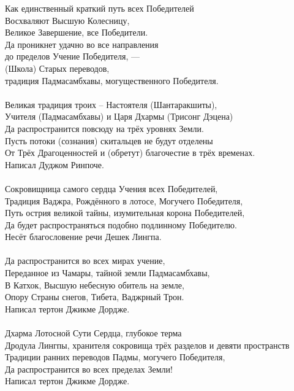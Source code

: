
Как единственный краткий путь всех Победителей\\
Восхваляют Высшую Колесницу, \\ \indent Великое Завершение, все Победители.\\
Да проникнет удачно во все направления \\ \indent до пределов Учение Победителя, —\\
(Школа) Старых переводов, \\ \indent традиция Падмасамбхавы, могущественного Победителя.\\
\\
Великая традиция троих – Настоятеля (Шантаракшиты),\\
Учителя (Падмасамбхавы) и Царя Дхармы (Трисонг Дэцена)\\
Да распространится повсюду на трёх уровнях Земли.\\
Пусть потоки (сознания) скитальцев не будут отделены\\
От Трёх Драгоценностей и (обретут) благочестие в трёх временах.\\
\scriptsize
Написал Дуджом Ринпоче.\\
\normalsize
\\
Сокровищница самого сердца Учения всех Победителей,\\
Традиция Ваджра, Рождённого в лотосе, Могучего Победителя,\\
Путь острия великой тайны, изумительная корона Победителей,\\
Да будет распространяться подобно подлинному Победителю.\\
\scriptsize
Несёт благословение речи Дешек Лингпа.\\
\normalsize
\\
Да распространится во всех мирах учение,\\
Переданное из Чамары, тайной земли Падмасамбхавы,\\
В Катхок, Высшую небесную обитель на земле,\\
Опору Страны снегов, Тибета, Ваджрный Трон.\\
\scriptsize
Написал тертон Джикме Дордже.\\
\normalsize
\\
Дхарма Лотосной Сути Сердца, глубокое терма\\
Дродула Лингпы, хранителя сокровища трёх разделов и девяти пространств\\
Традиции ранних переводов Падмы, могучего Победителя,\\
Да распространится во всех пределах Земли!\\
\scriptsize
Написал тертон Джикме Дордже.\\
\normalsize
\\

